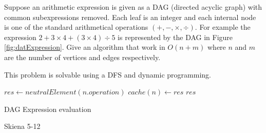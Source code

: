 \begin{problem}
Suppose an arithmetic expression is given as a DAG (directed acyclic graph)
with common subexpressions removed. Each leaf is an integer and each internal node is one of the standard arithmetical operations $(+, -, \times, \div )$.
For example the expression $2+3 \times 4 + (3 \times 4) \div 5$ is represented by the DAG in Figure \ref{fig:datExpression}. Give an algorithm that work in $O(n+m)$ where $n$ and $m$ are the number of vertices and edges respectively.


\begin{solution}
This problem is solvable using a DFS and dynamic programming.

\begin{algorithm}
  $res \gets neutralElement(n.operation)$\;
  $cache(n) \gets res$\;
  \Return $res$\;
 
\caption{DAG Expression evaluation}
\end{algorithm}


\end{solution}

\end{problem}


\begin{problem}
Skiena 5-12	

\begin{solution}



\end{solution}

\end{problem}

